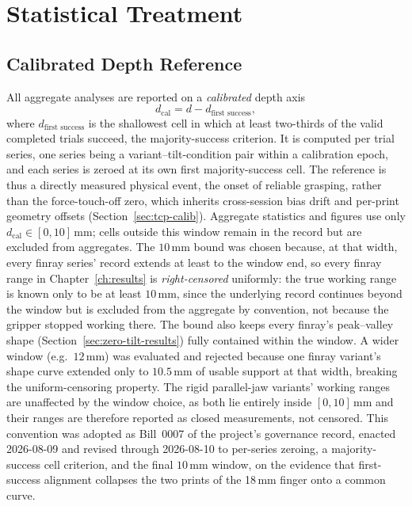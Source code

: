 \section{Statistical Treatment}
\label{sec:stats}

\subsection{Calibrated Depth Reference}
\label{sec:dcal}

All aggregate analyses are reported on a \emph{calibrated} depth axis
\begin{equation}
  d_{\text{cal}} = d - d_{\text{first success}},
  \label{eq:dcal}
\end{equation}
where $d_{\text{first success}}$ is the shallowest cell in which at
least two-thirds of the valid completed trials succeed, the
majority-success criterion. It is computed per trial series, one series
being a variant--tilt-condition pair within a calibration epoch, and
each series is zeroed at its own first majority-success cell. The reference is
thus a directly measured physical event, the onset of reliable
grasping, rather than the force-touch-off zero, which inherits
cross-session bias drift and per-print geometry offsets
(Section~\ref{sec:tcp-calib}). Aggregate statistics and figures use only
$d_{\text{cal}} \in [0, 10]$\,mm; cells outside this window remain in the
record but are excluded from aggregates. The $10$\,mm bound was chosen
because, at that width, every finray series' record extends at least to
the window end, so every finray range in Chapter~\ref{ch:results} is
\emph{right-censored} uniformly: the true working range is known only to
be at least $10$\,mm, since the underlying record continues beyond the
window but is excluded from the aggregate by convention, not because the
gripper stopped working there. The bound also keeps every finray's
peak--valley shape (Section~\ref{sec:zero-tilt-results}) fully
contained within the window. A
wider window (e.g.\ $12$\,mm) was evaluated and rejected because one
finray variant's shape curve extended only to $10.5$\,mm of usable
support at that width, breaking the uniform-censoring property. The rigid
parallel-jaw variants' working ranges are unaffected by the window
choice, as both lie entirely inside $[0,10]$\,mm and their ranges are
therefore reported as closed measurements, not censored. This convention
was adopted as Bill~0007 of the project's governance record, enacted
2026-08-09 and revised through 2026-08-10 to per-series zeroing, a
majority-success cell criterion, and the final $10$\,mm window, on the
evidence that first-success alignment collapses the
two prints of the 18\,mm finger onto a common curve.

